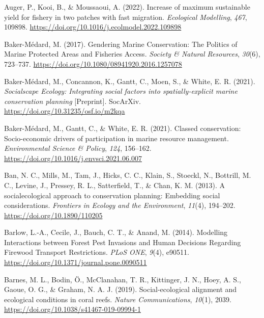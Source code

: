 \documentclass[
  12pt,
]{article}
\newlength{\cslhangindent}
\newlength{\cslentryspacingunit} %
\newenvironment{CSLReferences}[2] %
 {%
  \setlength{\parindent}{0pt}
  \ifodd #1
  \let\oldpar\par
  \def\par{\hangindent=\cslhangindent\oldpar}
  \fi
  \setlength{\parskip}{#2\cslentryspacingunit}
 }%
 {}
\begin{document}
\hypertarget{refs}{}
\begin{CSLReferences}{1}{2}
\leavevmode{}%
Auger, P., Kooi, B., \& Moussaoui, A. (2022). Increase of maximum sustainable yield for fishery in two patches with fast migration. \emph{Ecological Modelling}, \emph{467}, 109898. \url{https://doi.org/10.1016/j.ecolmodel.2022.109898}

\leavevmode{}%
Baker-Médard, M. (2017). Gendering {Marine Conservation}: {The Politics} of {Marine Protected Areas} and {Fisheries Access}. \emph{Society \& Natural Resources}, \emph{30}(6), 723--737. \url{https://doi.org/10.1080/08941920.2016.1257078}

\leavevmode{}%
Baker-Médard, M., Concannon, K., Gantt, C., Moen, S., \& White, E. R. (2021). \emph{Socialscape {Ecology}: {Integrating} social factors into spatially-explicit marine conservation planning} {[}Preprint{]}. {SocArXiv}. \url{https://doi.org/10.31235/osf.io/m2kqa}

\leavevmode{}%
Baker-Médard, M., Gantt, C., \& White, E. R. (2021). Classed conservation: {Socio-economic} drivers of participation in marine resource management. \emph{Environmental Science \& Policy}, \emph{124}, 156--162. \url{https://doi.org/10.1016/j.envsci.2021.06.007}

\leavevmode{}%
Ban, N. C., Mills, M., Tam, J., Hicks, C. C., Klain, S., Stoeckl, N., Bottrill, M. C., Levine, J., Pressey, R. L., Satterfield, T., \& Chan, K. M. (2013). A social{\textendash}ecological approach to conservation planning: Embedding social considerations. \emph{Frontiers in Ecology and the Environment}, \emph{11}(4), 194--202. \url{https://doi.org/10.1890/110205}

\leavevmode{}%
Barlow, L.-A., Cecile, J., Bauch, C. T., \& Anand, M. (2014). Modelling {Interactions} between {Forest Pest Invasions} and {Human Decisions Regarding Firewood Transport Restrictions}. \emph{PLoS ONE}, \emph{9}(4), e90511. \url{https://doi.org/10.1371/journal.pone.0090511}

\leavevmode{}%
Barnes, M. L., Bodin, Ö., McClanahan, T. R., Kittinger, J. N., Hoey, A. S., Gaoue, O. G., \& Graham, N. A. J. (2019). Social-ecological alignment and ecological conditions in coral reefs. \emph{Nature Communications}, \emph{10}(1), 2039. \url{https://doi.org/10.1038/s41467-019-09994-1}


\end{CSLReferences}
\end{document}
